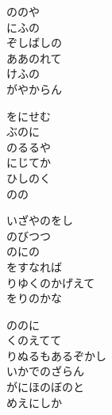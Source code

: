 \documentclass[10pt,b5j]{tarticle} %
\begin{document}
\vspace{1.5em} %
\newcommand{\linespace}{0.5em} %
\newcommand{\blocksize}{0.5\hsize} %
\begin{enumerate} %
    \begin{minipage}[c]{\blocksize}
    
        \vspace{\linespace}
        \item
        ののや\\
        にふの\\
        ぞしばしの\\
        ああのれて\\
        けふの\\
        がやからん
        
        \vspace{\linespace}
        \item
        をにせむ\\
        ぶのに\\
        のるるや\\
        にじてか\\
        ひしのく\\
        のの
        
        \vspace{\linespace}
        \item
        いざやのをし\\
        のびつつ\\
        のにの\\
        をすなれば\\
        りゆくのかげえて\\
        をりのかな
        
        \vspace{\linespace}
        \item
        ののに\\
        くのえてて\\
        りぬるもあるぞかし\\
        いかでのざらん\\
        がにほのぼのと\\
        めえにしか
        

\end{minipage}
\end{enumerate}
\end{document}
